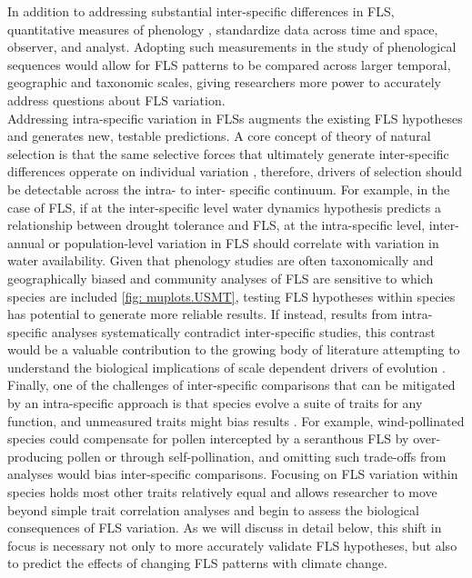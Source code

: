 \documentclass{article}
\begin{document}
{\noindent In addition to addressing substantial inter-specific differences in FLS, quantitative measures of phenology \citep[e.g. the BBCH scale,][]{Finn2007}, standardize data across time and space, observer, and analyst. Adopting such measurements in the study of phenological sequences would allow for FLS patterns to be compared across larger temporal, geographic and taxonomic scales, giving researchers more power to accurately address questions about FLS variation.\\

\noindent Addressing intra-specific variation in FLSs augments the existing FLS hypotheses and generates new, testable predictions. A core concept of theory of natural selection is that the same selective forces that ultimately generate inter-specific differences opperate on individual variation \citep{Dobzhansky1982, Schluter1996}, therefore, drivers of selection should be detectable across the intra- to inter- specific continuum. For example, in the case of FLS, if at the inter-specific level water dynamics hypothesis predicts a relationship between drought tolerance and FLS, at the intra-specific level, inter-annual or population-level variation in FLS should correlate with variation in water availability. Given that phenology studies are often taxonomically and geographically biased \citep{Wolkovich2014,Willis2017} and community analyses of FLS are sensitive to which species are included \ref{fig: muplots.USMT}, testing FLS hypotheses within species has potential to generate more reliable results. If instead, results from intra-specific analyses systematically contradict inter-specific studies, this contrast would be a valuable contribution to the growing body of literature attempting to understand the biological implications of scale dependent drivers of evolution \citep[e.g.,][]{Violle2012,Shipley2016,Anderegg2018}.  \\
 
\noindent Finally, one of the challenges of inter-specific comparisons that can be mitigated by an intra-specific approach is that species evolve a suite of traits for any function, and unmeasured traits might bias results \citep{Davies2019}. For example, wind-pollinated species could compensate for pollen intercepted by a seranthous FLS by over-producing pollen or through self-pollination, and omitting such trade-offs from analyses would bias inter-specific comparisons. Focusing on FLS variation within species holds most other traits relatively equal and allows researcher to move beyond simple trait correlation analyses and begin to assess the biological consequences of FLS variation. As we will discuss in detail below, this shift in focus is necessary not only to more accurately validate FLS hypotheses, but also to predict the effects of changing FLS patterns with climate change. \\


}
\end{document}
